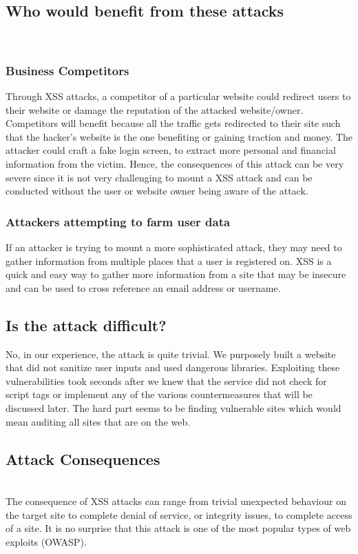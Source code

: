 \documentclass[conference]{IEEEtran}
\begin{document}
\subsection{Who would benefit from these attacks}\\

\subsubsection{Business Competitors}
Through XSS attacks, a competitor of a particular website could redirect users to their website or damage the reputation of the attacked website/owner. Competitors will benefit because all the traffic gets redirected to their site such that the hacker’s website is the one benefiting or gaining traction and money. The attacker could craft a fake login screen, to extract more personal and financial information from the victim. Hence, the consequences of this attack can be very severe since it is not very challenging to mount a XSS attack and can be conducted without the user or website owner being aware of the attack.\\
\subsubsection{Attackers attempting to farm user data}
If an attacker is trying to mount a more sophisticated attack, they may need to gather information from multiple places that a user is registered on. XSS is a quick and easy way to gather more information from a site that may be insecure and can be used to cross reference an email address or username.

\subsection{Is the attack difficult?}
No, in our experience, the attack is quite trivial. We purposely built a website that did not sanitize user inputs and used dangerous libraries. Exploiting these vulnerabilities took seconds after we knew that the service did not check for script tags or implement any of the various countermeasures that will be discussed later. The hard part seems to be finding vulnerable sites which would mean auditing all sites that are on the web. 

\subsection{Attack Consequences}\\
The consequence of XSS attacks can range from trivial unexpected behaviour on the target site to complete denial of service, or integrity issues, to complete access of a site. It is no surprise that this attack is one of the most popular types of web exploits (OWASP).
\end{document}
